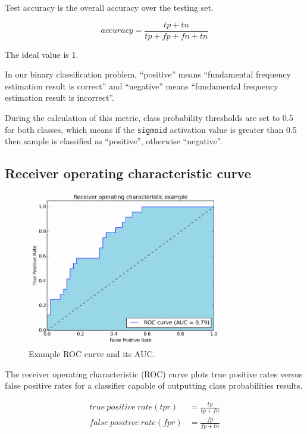 \documentclass[11pt,a4paper]{report}
\begin{document}
Test accuracy is the overall accuracy over the testing set.

\begin{equation*}
  accuracy = \frac{tp+tn}{tp+fp+fn+tn}
\end{equation*}

The ideal value is 1.

In our binary classification problem, \enquote{positive} means \enquote{fundamental frequency estimation result is correct} and \enquote{negative} means \enquote{fundamental frequency estimation result is incorrect}.

During the calculation of this metric, class probability thresholds are set to 0.5 for both classes, which means if the \texttt{sigmoid} activation value is greater than 0.5 then sample is classified as \enquote{positive}, otherwise \enquote{negative}.

\subsection{Receiver operating characteristic curve}

\begin{figure}[htbp]
  \centering
  \includegraphics[width=0.8\textwidth]{roc-auc.png}
  \caption{Example ROC curve and its AUC.} \label{fig:roc}
\end{figure}

The receiver operating characteristic (ROC) curve plots true positive rates versus false positive rates for a classifier capable of outputting class probabilities results.

\begin{align*}
  true\ positive\ rate (tpr) & = \frac{tp}{tp+fn} \\
  false\ positive\ rate (fpr) & = \frac{fp}{fp+tn}
\end{align*}
\end{document}

